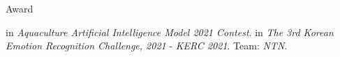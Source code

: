 \begin{rubric}{Award}


\entry*[2021]
	 \href{http://sarc.jnu.ac.kr/contest/20211105/}{\color{blue}{First place}} in \textit{Aquaculture Artificial Intelligence Model 2021 Contest}.
%
\entry*[2021]
	 \href{https://www.kaggle.com/competitions/kerc2021/leaderboard}{\color{blue}{Second place}} in \textit{The 3rd Korean Emotion Recognition Challenge, 2021} - \textit{KERC 2021}. Team: \emph{NTN}.
%


%
%
\end{rubric}